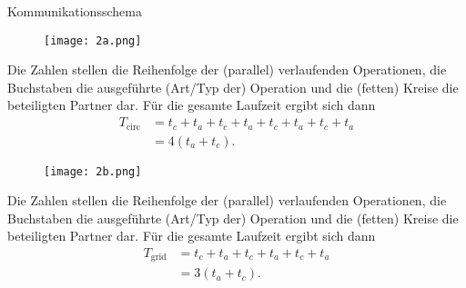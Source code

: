 \documentclass[
ngerman,
subtask=ruled %
]{tudaexercise}
\begin{document}
	
	\begin{task}{Kommunikationsschema}
		\begin{subtask}[title=]
			\begin{figure}[H]
				\centering
				\texttt{[image: 2a.png]}
			\end{figure}
			Die Zahlen stellen die Reihenfolge der (parallel) verlaufenden Operationen, die Buchstaben die ausgeführte (Art/Typ der) Operation und die (fetten) Kreise die beteiligten Partner dar.
			Für die gesamte Laufzeit ergibt sich dann
			\begin{align}
				T_\text{circ} &= t_c + t_a + t_c + t_a + t_c + t_a + t_c + t_a \\
				&= 4 (t_a + t_c).
			\end{align}
		\end{subtask}
		\begin{subtask}[title=]
			\begin{figure}[H]
				\centering
				\texttt{[image: 2b.png]}
			\end{figure}
			Die Zahlen stellen die Reihenfolge der (parallel) verlaufenden Operationen, die Buchstaben die ausgeführte (Art/Typ der) Operation und die (fetten) Kreise die beteiligten Partner dar.
			Für die gesamte Laufzeit ergibt sich dann
			\begin{align}
				T_\text{grid} &= t_c + t_a + t_c + t_a + t_c + t_a \\
				&= 3 (t_a + t_c).
			\end{align}
		\end{subtask}
	\end{task}
	
\end{document}
